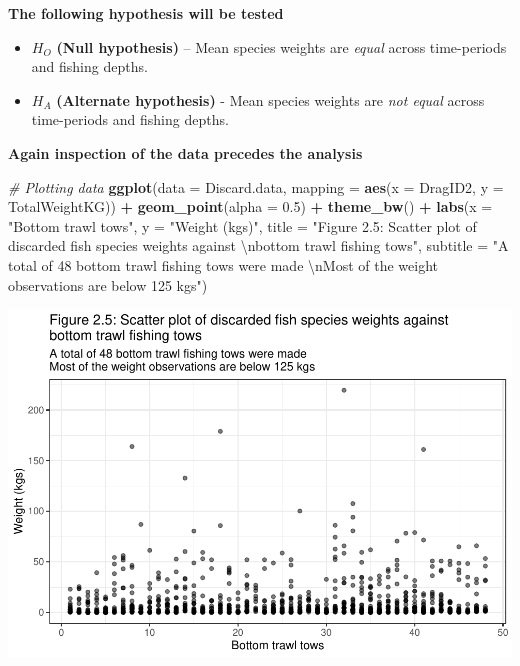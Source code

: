 \documentclass[
]{book}
\newenvironment{Shaded}{\begin{snugshade}}{\end{snugshade}}
\newcommand{\CharTok}[1]{\textcolor[rgb]{0.31,0.60,0.02}{#1}}
\newcommand{\CommentTok}[1]{\textcolor[rgb]{0.56,0.35,0.01}{\textit{#1}}}
\newcommand{\DataTypeTok}[1]{\textcolor[rgb]{0.13,0.29,0.53}{#1}}
\newcommand{\FloatTok}[1]{\textcolor[rgb]{0.00,0.00,0.81}{#1}}
\newcommand{\KeywordTok}[1]{\textcolor[rgb]{0.13,0.29,0.53}{\textbf{#1}}}
\newcommand{\NormalTok}[1]{#1}
\newcommand{\OperatorTok}[1]{\textcolor[rgb]{0.81,0.36,0.00}{\textbf{#1}}}
\newcommand{\StringTok}[1]{\textcolor[rgb]{0.31,0.60,0.02}{#1}}
\begin{document}
\textbf{The following hypothesis will be tested}

\begin{itemize}
\item
  \(H_O\) \textbf{(Null hypothesis)} -- Mean species weights are \emph{equal} across time-periods and fishing depths.
\item
  \(H_A\) \textbf{(Alternate hypothesis)} - Mean species weights are \emph{not equal} across time-periods and fishing depths.
\end{itemize}

\textbf{Again inspection of the data precedes the analysis}

\begin{Shaded}
\begin{Highlighting}[]
\CommentTok{# Plotting data}
\KeywordTok{ggplot}\NormalTok{(}\DataTypeTok{data =}\NormalTok{ Discard.data,}
  \DataTypeTok{mapping =} \KeywordTok{aes}\NormalTok{(}\DataTypeTok{x =}\NormalTok{ DragID2,}
    \DataTypeTok{y =}\NormalTok{ TotalWeightKG)) }\OperatorTok{+}
\StringTok{  }\KeywordTok{geom_point}\NormalTok{(}\DataTypeTok{alpha =} \FloatTok{0.5}\NormalTok{) }\OperatorTok{+}
\StringTok{  }\KeywordTok{theme_bw}\NormalTok{() }\OperatorTok{+}
\StringTok{  }\KeywordTok{labs}\NormalTok{(}\DataTypeTok{x =} \StringTok{"Bottom trawl tows"}\NormalTok{,}
    \DataTypeTok{y =} \StringTok{"Weight (kgs)"}\NormalTok{,}
    \DataTypeTok{title =} \StringTok{"Figure 2.5: Scatter plot of discarded fish species weights against }\CharTok{\textbackslash{}n}\StringTok{bottom trawl fishing tows"}\NormalTok{,}
    \DataTypeTok{subtitle =} \StringTok{"A total of 48 bottom trawl fishing tows were made }\CharTok{\textbackslash{}n}\StringTok{Most of the weight observations are below 125 kgs"}\NormalTok{)}
\end{Highlighting}
\end{Shaded}

\begin{center}\includegraphics{bookdown-demo_files/figure-latex/unnamed-chunk-17-1} \end{center}
\end{document}
